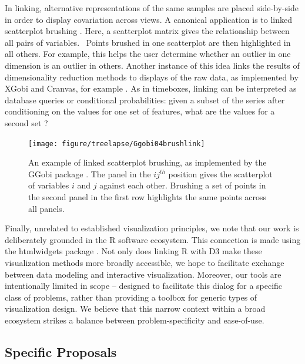 In linking, alternative representations of the same samples are placed
side-by-side in order to display covariation across views. A canonical
application is to linked scatterplot brushing \citep{becker1987brushing}. Here,
a scatterplot matrix gives the relationship between all pairs of variables.
~Points brushed in one scatterplot are then highlighted in all others. For
example, this helps the user determine whether an outlier in one dimension is an
outlier in others. Another instance of this idea links the results of
dimensionality reduction methods to displays of the raw data, as implemented by
XGobi and Cranvas, for example \citep{xie2013cranvas, swayne1998xgobi}. As in
timeboxes, linking can be interpreted as database queries or conditional
probabilities: given a subset of the series after conditioning on the values for
one set of features, what are the values for a second set
\citep{buja1996interactive}?

\begin{figure}
  \centering
  \texttt{[image: figure/treelapse/Ggobi04brushlink]}
  \caption{
    An example of linked scatterplot brushing, as implemented by the GGobi
    package \citep{voigt2002extended}. The panel in the $ij^{th}$ position gives
    the scatterplot of variables $i$ and $j$ against each other. Brushing a
    set of points in the second panel in the first row highlights the same
    points across all panels.
    \label{fig:ggobi_brushlink} }
\end{figure}

Finally, unrelated to established visualization principles, we note that our
work is deliberately grounded in the R software ecosystem. This connection is
made using the htmlwidgets package \citep{vaidyanathan2014htmlwidgets}. Not only
does linking R with D3 make these visualization methods more broadly accessible,
we hope to facilitate exchange between data modeling and interactive
visualization. Moreover, our tools are intentionally limited in scope --
designed to facilitate this dialog for a specific class of problems, rather than
providing a toolbox for generic types of visualization design. We believe that
this narrow context within a broad ecosystem strikes a balance between
problem-specificity and ease-of-use.

\subsection{Specific Proposals}\label{specific-proposals}

